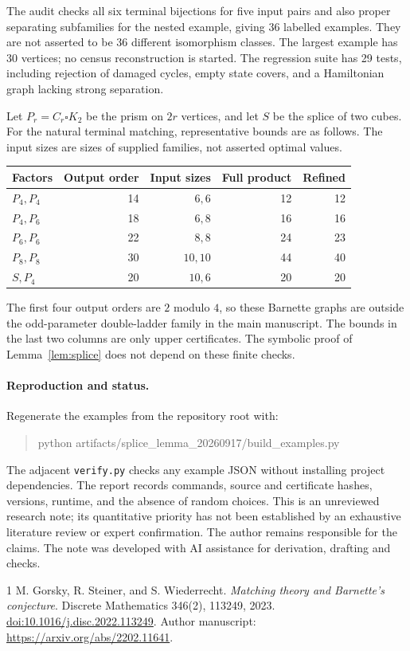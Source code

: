 \documentclass[10pt]{article}
\begin{document}
The audit checks all six terminal bijections for five input pairs and also
proper separating subfamilies for the nested example, giving 36 labelled
examples. They are not asserted to be 36 different isomorphism classes.
The largest example has 30 vertices; no census reconstruction is started.
The regression suite has 29 tests, including rejection of damaged cycles,
empty state covers, and a Hamiltonian graph lacking strong separation.

Let $P_r=C_r\square K_2$ be the prism on $2r$ vertices, and let $S$ be the
splice of two cubes. For the natural terminal matching, representative bounds
are as follows. The input sizes are sizes of supplied families, not asserted
optimal values.
\begin{center}
\begin{tabular}{lrrrr}
\toprule
Factors & Output order & Input sizes & Full product & Refined\\
\midrule
$P_4,P_4$ &14&$6,6$&12&12\\
$P_4,P_6$ &18&$6,8$&16&16\\
$P_6,P_6$ &22&$8,8$&24&23\\
$P_8,P_8$ &30&$10,10$&44&40\\
$S,P_4$ &20&$10,6$&20&20\\
\bottomrule
\end{tabular}
\end{center}
The first four output orders are $2$ modulo $4$, so these Barnette graphs
are outside the odd-parameter double-ladder family in the main manuscript.
The bounds in the last two columns are only upper certificates. The symbolic
proof of Lemma~\ref{lem:splice} does not depend on these finite checks.

\paragraph{Reproduction and status.}
Regenerate the examples from the repository root with:
\begin{quote}\small\ttfamily
python artifacts/splice\_lemma\_20260917/build\_examples.py
\end{quote}
The adjacent \texttt{verify.py} checks any example JSON without installing
project dependencies. The report records
commands, source and certificate hashes, versions, runtime, and the absence
of random choices. This is an unreviewed research note; its quantitative
priority has not been established by an exhaustive literature review or
expert confirmation. The author remains responsible for the claims.
The note was developed with AI assistance for derivation, drafting and checks.

\begin{thebibliography}{1}
M. Gorsky, R. Steiner, and S. Wiederrecht.
\emph{Matching theory and Barnette's conjecture}.
Discrete Mathematics 346(2), 113249, 2023.
\href{https://doi.org/10.1016/j.disc.2022.113249}{doi:10.1016/j.disc.2022.113249}.
Author manuscript: \url{https://arxiv.org/abs/2202.11641}.
\end{thebibliography}
\end{document}
